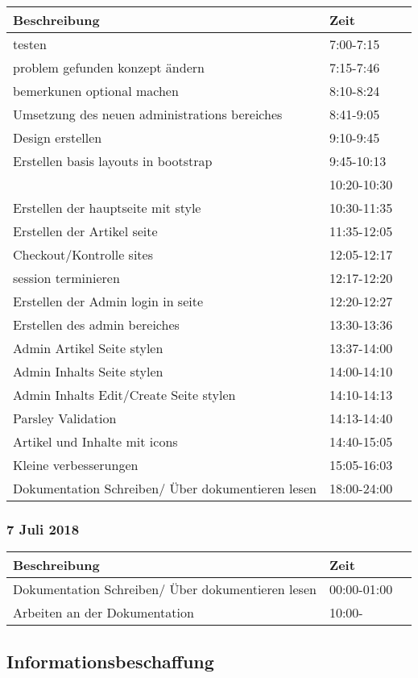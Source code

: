 \documentclass[a4paper, 11pt]{article}
\begin{document}
\begin{tabular}{llr}
\toprule
Beschreibung & Zeit \\
\midrule
testen & 7:00-7:15 \\
problem gefunden konzept ändern & 7:15-7:46 \\
bemerkunen optional machen & 8:10-8:24 \\
Umsetzung des neuen administrations bereiches & 8:41-9:05 \\
Design erstellen & 9:10-9:45 \\
Erstellen basis layouts in bootstrap & 9:45-10:13 \\
 & 10:20-10:30 \\
Erstellen der hauptseite mit style & 10:30-11:35 \\
Erstellen der Artikel seite & 11:35-12:05 \\
Checkout/Kontrolle sites & 12:05-12:17 \\
session terminieren & 12:17-12:20 \\
Erstellen der Admin login in seite & 12:20-12:27 \\
Erstellen des admin bereiches & 13:30-13:36 \\
Admin Artikel Seite stylen & 13:37-14:00 \\
Admin Inhalts Seite stylen & 14:00-14:10 \\
Admin Inhalts Edit/Create Seite stylen & 14:10-14:13 \\
Parsley Validation & 14:13-14:40 \\
Artikel und Inhalte mit icons & 14:40-15:05 \\
Kleine verbesserungen & 15:05-16:03 \\
Dokumentation Schreiben/ Über dokumentieren lesen & 18:00-24:00 \\
\bottomrule
\end{tabular}

\subsubsection{7 Juli 2018}

\begin{tabular}{llr}
\toprule
Beschreibung & Zeit \\
\midrule
Dokumentation Schreiben/ Über dokumentieren lesen & 00:00-01:00 \\
Arbeiten an der Dokumentation & 10:00- \\
\bottomrule
\end{tabular}

\subsection{Informationsbeschaffung}
\end{document}
